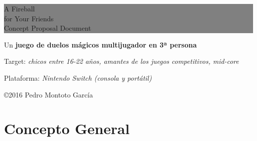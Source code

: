 \documentclass[12pt]{article}
\begin{document}
\thispagestyle{empty} %


\colorbox{grey}{
	\parbox[t]{1.0\linewidth}{
		\fontsize{50pt}{30pt}\selectfont %
		\vspace*{0.7cm} %
		
		A Fireball \\ 
		for Your Friends \\ 
        \fontsize{30pt}{34pt}\selectfont
        Concept Proposal Document		
		\par
		
		\vspace*{0.4cm} %
	}
}

\vspace*{0.4cm} 
{\large Un \textbf{juego de duelos mágicos multijugador en 3ª persona}}

\begin{spacing}{0.6}
Target: \textit{chicos entre 16-22 años, amantes de los juegos competitivos, mid-core} 

Plataforma: \textit{Nintendo Switch (consola y portátil)}
\end{spacing}


\vfill %

{\centering \hfill \copyright 2016 Pedro Montoto García} \\


\clearpage %

\printindex

\clearpage %

\setlength{\voffset}{0cm}
\setlength{\parindent}{1cm}
\setcounter{page}{1}

\section{Concepto General}
\end{document}
